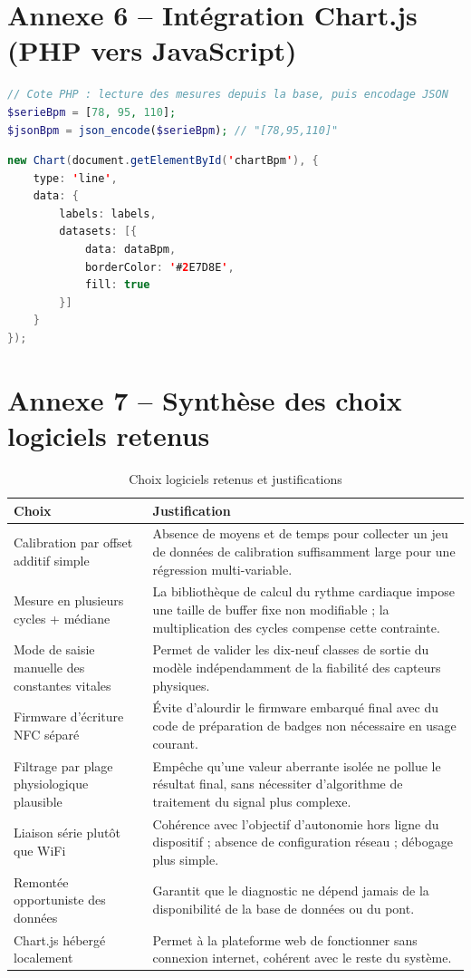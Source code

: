 \documentclass[12pt,a4paper]{report}
\begin{document}
\section{Annexe 6 -- Intégration Chart.js (PHP vers JavaScript)}
\begin{lstlisting}[language=PHP]
// Cote PHP : lecture des mesures depuis la base, puis encodage JSON
$serieBpm = [78, 95, 110];
$jsonBpm = json_encode($serieBpm); // "[78,95,110]"
\end{lstlisting}
\begin{lstlisting}[language=Java, caption={Creation de la courbe cote JavaScript}]
new Chart(document.getElementById('chartBpm'), {
    type: 'line',
    data: {
        labels: labels,
        datasets: [{
            data: dataBpm,
            borderColor: '#2E7D8E',
            fill: true
        }]
    }
});
\end{lstlisting}

\section{Annexe 7 -- Synthèse des choix logiciels retenus}
\begin{table}[H]
\centering
\small
\begin{tabular}{p{5.5cm}p{8.5cm}}
\toprule
\textbf{Choix} & \textbf{Justification} \\
\midrule
Calibration par offset additif simple & Absence de moyens et de temps pour collecter un jeu de données de calibration suffisamment large pour une régression multi-variable. \\
Mesure en plusieurs cycles + médiane & La bibliothèque de calcul du rythme cardiaque impose une taille de buffer fixe non modifiable ; la multiplication des cycles compense cette contrainte. \\
Mode de saisie manuelle des constantes vitales & Permet de valider les dix-neuf classes de sortie du modèle indépendamment de la fiabilité des capteurs physiques. \\
Firmware d'écriture NFC séparé & Évite d'alourdir le firmware embarqué final avec du code de préparation de badges non nécessaire en usage courant. \\
Filtrage par plage physiologique plausible & Empêche qu'une valeur aberrante isolée ne pollue le résultat final, sans nécessiter d'algorithme de traitement du signal plus complexe. \\
Liaison série plutôt que WiFi & Cohérence avec l'objectif d'autonomie hors ligne du dispositif ; absence de configuration réseau ; débogage plus simple. \\
Remontée opportuniste des données & Garantit que le diagnostic ne dépend jamais de la disponibilité de la base de données ou du pont. \\
Chart.js hébergé localement & Permet à la plateforme web de fonctionner sans connexion internet, cohérent avec le reste du système. \\
\bottomrule
\end{tabular}
\caption{Choix logiciels retenus et justifications}
\end{table}
\end{document}
